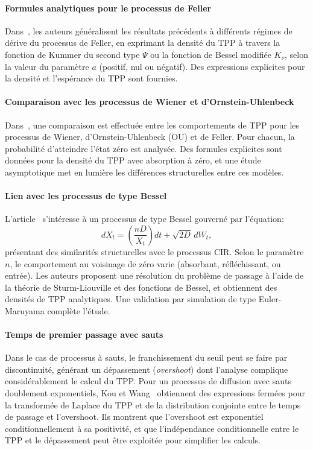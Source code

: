 \paragraph{Formules analytiques pour le processus de Feller}

Dans~\cite{giorno2021}, les auteurs généralisent les résultats précédents à différents régimes de dérive du processus de Feller, en exprimant la densité du \acs{TPP} à travers la fonction de Kummer du second type \( \Psi \) ou la fonction de Bessel modifiée \( K_\nu \), selon la valeur du paramètre \( a \) (positif, nul ou négatif). Des expressions explicites pour la densité et l'espérance du \acs{TPP} sont fournies.

\paragraph{Comparaison avec les processus de Wiener et d'Ornstein-Uhlenbeck}

Dans~\cite{giorno2023}, une comparaison est effectuée entre les comportements de \acs{TPP} pour les processus de Wiener, d'Ornstein-Uhlenbeck (OU) et de Feller. Pour chacun, la probabilité d'atteindre l'état zéro est analysée. Des formules explicites sont données pour la densité du \acs{TPP} avec absorption à zéro, et une étude asymptotique met en lumière les différences structurelles entre ces modèles.

\paragraph{Lien avec les processus de type Bessel}

L'article~\cite{martin2011} s'intéresse à un processus de type Bessel gouverné par l'équation:
\[
dX_t = \left(\frac{nD}{X_t}\right) dt + \sqrt{2D}\, dW_t,
\]
présentant des similarités structurelles avec le processus \acs{CIR}. Selon le paramètre \( n \), le comportement au voisinage de zéro varie (absorbant, réfléchissant, ou entrée). Les auteurs proposent une résolution du problème de passage à l'aide de la théorie de Sturm-Liouville et des fonctions de Bessel, et obtiennent des densités de \acs{TPP} analytiques. Une validation par simulation de type Euler-Maruyama complète l'étude.

\paragraph{Temps de premier passage avec sauts}

Dans le cas de processus à sauts, le franchissement du seuil peut se faire par discontinuité, générant un dépassement (\textit{overshoot}) dont l'analyse complique considérablement le calcul du \acs{TPP}. Pour un processus de diffusion avec sauts doublement exponentiels, Kou et Wang~\cite{kou2003} obtiennent des expressions fermées pour la transformée de Laplace du \acs{TPP} et de la distribution conjointe entre le temps de passage et l'overshoot. Ils montrent que l'overshoot est exponentiel conditionnellement à sa positivité, et que l'indépendance conditionnelle entre le \acs{TPP} et le dépassement peut être exploitée pour simplifier les calculs.

